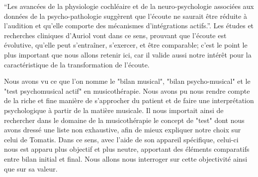 \enquote {Les avancées de la physiologie cochléaire et de la neuro-psychologie associées aux données 
de la psycho-pathologie suggèrent que l'écoute ne saurait être réduite à l'audition et qu'elle comporte 
des mécanismes d'intégrations actifs.}\autocite[58]{auriol:cle}. Les études et recherches cliniques 
d'Auriol vont dans ce sens, prouvant que l'écoute est évolutive, qu'elle peut  s'entraîner, s'exercer, et  
être comparable;  
c'est le point le plus important que nous allons retenir ici,  car il valide aussi notre intérêt pour la 
caractéristique de la transformation de l'écoute. %

Nous avons vu ce que l'on nomme le "bilan musical", "bilan psycho-musical" et le  "test psychomusical 
actif" en musicothérapie. Nous avons pu nous rendre compte de la riche et fine manière de s'approcher 
du patient et de faire  une interprétation psychologique à partir de la matière musicale.
Il nous importait ainsi de rechercher dans le domaine de la musicothérapie le concept de "test" dont 
nous 
avons dressé une  liste non exhaustive, %
 afin de mieux 
expliquer notre choix sur celui de  Tomatis. Dans ce sens, avec 
l'aide de son 
appareil spécifique, celui-ci nous est apparu 
plus objectif et plus neutre, apportant 
des éléments comparatifs entre bilan initial et final.
Nous allons nous interroger sur cette 
objectivité ainsi que  sur sa valeur.



